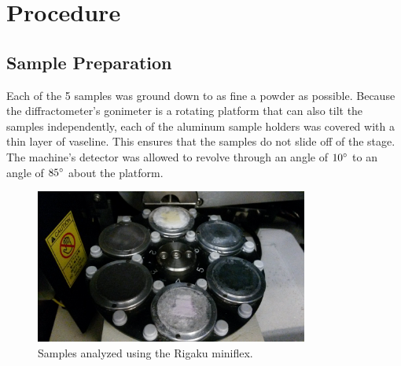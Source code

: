\documentclass[12pt]{article}
\begin{document}
\section{Procedure}

\subsection{Sample Preparation}
Each of the 5 samples was ground down to as fine a powder as possible. Because the diffractometer's gonimeter is a rotating platform that can also tilt the samples independently, each of the aluminum sample holders was covered with a thin layer of vaseline. This ensures that the samples do not slide off of the stage. The machine's detector was allowed to revolve through an angle of $10\degree$ to an angle of $85\degree$ about the platform.

\begin{figure}[h!]\centering
 \quad \includegraphics[width=0.8\textwidth]{samples}
\caption{Samples analyzed using the Rigaku miniflex.}
\label{fig:samples}
\end{figure}
\end{document}
